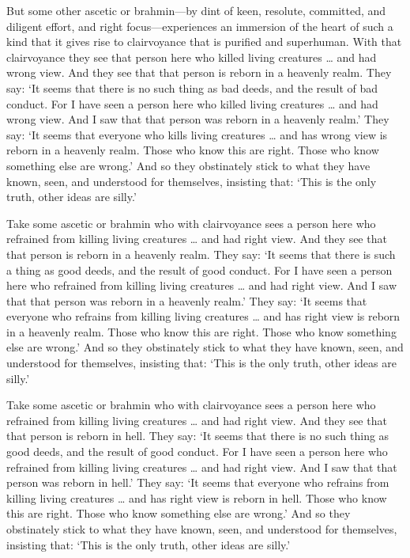 \documentclass[12pt,openany]{book}%
\begin{document}
But some other ascetic or brahmin—by dint of keen, resolute, committed, and diligent effort, and right focus—experiences an immersion of the heart of such a kind that it gives rise to clairvoyance that is purified and superhuman. With that clairvoyance they see that person here who killed living creatures … and had wrong view. And they see that that person is reborn in a heavenly realm. They say: ‘It seems that there is no such thing as bad deeds, and the result of bad conduct. For I have seen a person here who killed living creatures … and had wrong view. And I saw that that person was reborn in a heavenly realm.’ They say: ‘It seems that everyone who kills living creatures … and has wrong view is reborn in a heavenly realm. Those who know this are right. Those who know something else are wrong.’ And so they obstinately stick to what they have known, seen, and understood for themselves, insisting that: ‘This is the only truth, other ideas are silly.’ 

Take some ascetic or brahmin who with clairvoyance sees a person here who refrained from killing living creatures … and had right view. And they see that that person is reborn in a heavenly realm. They say: ‘It seems that there is such a thing as good deeds, and the result of good conduct. For I have seen a person here who refrained from killing living creatures … and had right view. And I saw that that person was reborn in a heavenly realm.’ They say: ‘It seems that everyone who refrains from killing living creatures … and has right view is reborn in a heavenly realm. Those who know this are right. Those who know something else are wrong.’ And so they obstinately stick to what they have known, seen, and understood for themselves, insisting that: ‘This is the only truth, other ideas are silly.’ 

Take some ascetic or brahmin who with clairvoyance sees a person here who refrained from killing living creatures … and had right view. And they see that that person is reborn in hell. They say: ‘It seems that there is no such thing as good deeds, and the result of good conduct. For I have seen a person here who refrained from killing living creatures … and had right view. And I saw that that person was reborn in hell.’ They say: ‘It seems that everyone who refrains from killing living creatures … and has right view is reborn in hell. Those who know this are right. Those who know something else are wrong.’ And so they obstinately stick to what they have known, seen, and understood for themselves, insisting that: ‘This is the only truth, other ideas are silly.’ 
\end{document}
